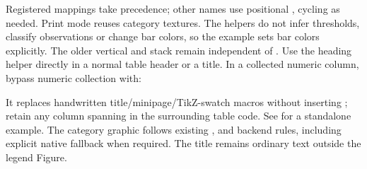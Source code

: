 Registered \key{\gradbarscategory} mappings take precedence; other names use
positional , cycling as needed. Print mode reuses category
textures. The helpers do not infer thresholds, classify observations or change
bar colors, so the example sets bar colors explicitly. The older vertical
\key{\gradbarslegend} and stack  remain independent of
.
Use the heading helper directly in a normal table header or a \key{\gradcolumn}
title. In a collected numeric column, bypass numeric collection with:
\begin{source}
\end{source}
It replaces handwritten title/minipage/TikZ-swatch macros without inserting
\key{\multicolumn}; retain any column spanning in the surrounding table code.
See  for a standalone example.
The category graphic follows existing ,  and
 backend rules, including explicit native fallback when
required. The title remains ordinary text outside the legend Figure.


